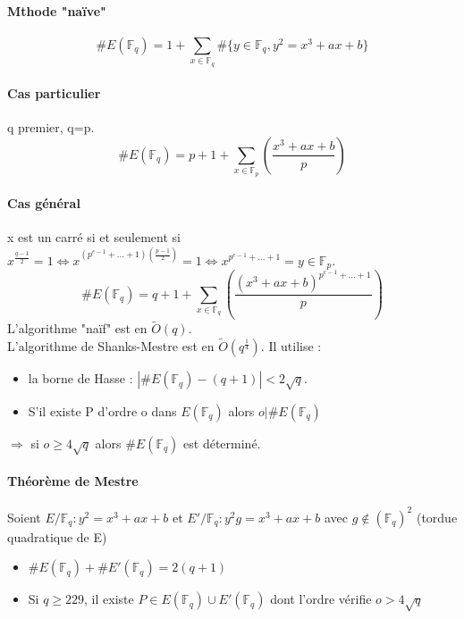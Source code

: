 \documentclass[12pt,a4paper]{report}
\begin{document}
\paragraph{Mthode "naïve"\\}
$$\# E(\mathbb{F}_q) = 1 + \sum_{x \in \mathbb{F}_q} \# \{y \in \mathbb{F}_q,y^2 = x^3 +ax+b\}$$
\paragraph{Cas particulier\\}
q premier, q=p.
$$\# E(\mathbb{F}_q) = p+1 + \sum_{x \in \mathbb{F}_p} \left(\frac{x^3+ax+b}{p}\right)$$
\paragraph{Cas général\\}
x est un carré si et seulement si $\displaystyle x^{\frac{q-1}{2}}=1 \Leftrightarrow x^{(p^{e-1}+\ldots+ 1)\left(\frac{p-1}{2}\right)} =1  \Leftrightarrow x^{p^{e-1}+\ldots+ 1} = y \in \mathbb{F}_p$.\\
$$ \# E(\mathbb{F}_q) = q+1 + \sum_{x \in \mathbb{F}_q} \left(\frac{(x^3+ax+b)^{p^{e-1}+\ldots+1}}{p}\right)$$
L'algorithme "naïf" est en $ \tilde{O}(q)$.\\
L'algorithme de Shanks-Mestre est en $ \tilde{O}(q^{\frac{1}{4}})$.
Il utilise : 
\begin{itemize}
\item la borne de Hasse : $ |\# E(\mathbb{F}_q)  -(q+1) | < 2 \sqrt{q} $.
\item S'il existe P d'ordre o dans $E(\mathbb{F}_q) $ alors $ o | \# E(\mathbb{F}_q) $
\end{itemize}
$ \Longrightarrow $ si $ o \geqslant 4\sqrt{q} $ alors $\# E(\mathbb{F}_q) $ est déterminé.
\paragraph{Théorème de Mestre\\}
Soient $ E/\mathbb{F}_q : y^2 = x^3+ax+b$ et $ E'/\mathbb{F}_q : y^2g=x^3+ax+b$ avec $g \not \in (\mathbb{F}_q)^2 $ (tordue quadratique de E)
\begin{itemize}
\item $\# E(\mathbb{F}_q)  + \# E'(\mathbb{F}_q) = 2(q+1)$
\item Si $q \geqslant 229$, il existe $P\in E(\mathbb{F}_q) \cup E'(\mathbb{F}_q)$ dont l'ordre vérifie $o > 4\sqrt{q}$ 
\end{itemize}
\end{document}
